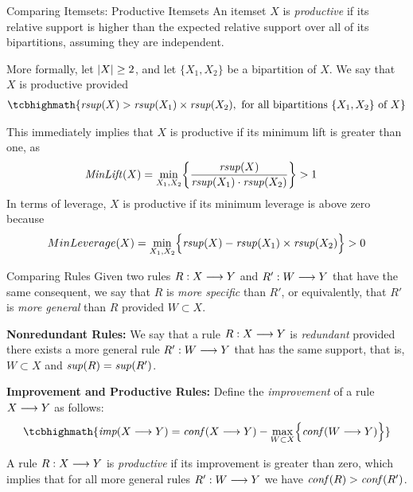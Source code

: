 \begin{frame}{Comparing Itemsets: Productive Itemsets}
An itemset $X$ is {\em productive}
if its
relative support is higher than the expected
relative support over all of its bipartitions,
assuming they are independent.

More formally, let $|X| \ge 2$, and let
$\{X_1,X_2\}$ be a bipartition of $X$.
We say that $X$ is productive provided
\begin{align*}
\tcbhighmath{
\rsupp(X) > \rsupp(X_1) \times \rsupp(X_2),
\text{ for all bipartitions } \{X_1, X_2\} \text{ of } X
}
\end{align*}

\bigskip
This immediately implies that
$X$ is productive if its minimum lift is greater than one, as
\begin{align*}
  \mathit{MinLift}(X) & =
  \min_{X_1,X_2} \biggl\{ \frac{\mathit{rsup}(X)}{\mathit{rsup}(X_1) \cdot
  \mathit{rsup}(X_2)} \biggr\}
  > 1
\end{align*}
In terms of leverage, $X$ is productive if its minimum leverage is above
zero because
\begin{align*}
MinLeverage(X) =
\min_{X_1,X_2} \Bigl\{
\mathit{rsup}(X) - \mathit{rsup}(X_1) \times \mathit{rsup}(X_2)
\Bigr\} > 0
\end{align*}
\end{frame}


\begin{frame}{Comparing Rules}
Given two rules $R: X \arule Y$ and $R': W \arule Y$ that have the same
consequent, we say that $R$ is {\em more specif\/{i}c} than $R'$, or
equivalently, that $R'$ is {\em more general} than $R$
provided $W \subset X$.

\medskip
{\bf Nonredundant Rules:} We say that a rule $R: X \arule Y$
is {\em redundant} provided there exists a more general rule
$R': W \arule Y$ that has the same support, that is, $W\subset X$ and $\mathit{sup}(R) = \mathit{sup}(R')$.

\medskip
{\bf Improvement and Productive Rules:}
Def\/{i}ne the {\em improvement}
of
a rule $X \arule Y$ as follows:
\begin{align*}
\tcbhighmath{
\textit{imp}(X \arule Y) = \conff (X \arule Y)
- \max_{W \subset X} \Bigl\{\conff (W \arule Y) \Bigr\}
}
\end{align*}

\medskip
A rule $R: X \arule Y$ is {\em productive} if
its improvement is greater than zero, which implies that
for all more general rules $R': W \arule
Y$ we have  $\mathit{conf}(R) > \mathit{conf}(R')$. 
\end{frame}


